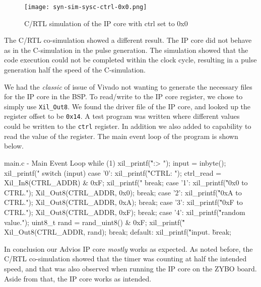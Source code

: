 \documentclass[../main.tex]{subfiles}
\begin{document}
\begin{figure}[h]
    \centering
    \texttt{[image: syn-sim-sysc-ctrl-0x0.png]}
    \caption{C/RTL simulation of the IP core with ctrl set to 0x0}
\end{figure}

The C/RTL co-simulation showed a different result. The IP core did not behave as in the C-simulation in the pulse generation. 
The simulation showed that the code execution could not be completed within the clock cycle, resulting in a pulse generation half the speed of the C-simulation.

\newpage

We had the \textit{classic} of issue of Vivado not wanting to generate the necessary files for the IP core in the BSP. To read/write to the IP core register, we chose to simply use \texttt{Xil\_Out8}. We found the driver file of the IP core, and looked up the register offset to be \texttt{0x14}. A test program was written where different values could be written to the \texttt{ctrl} register. In addition we also added to capability to read the value of the register. The main event loop of the program is shown below.

\begin{myminted}{main.c - Main Event Loop}
while (1)
{
    xil_printf("\r\n\nCMD:> ");
    input = inbyte();
    xil_printf("%
    switch (input)
    {
        case '0':
            xil_printf("\r\nReading CTRL: ");
            ctrl_read = Xil_In8(CTRL_ADDR) & 0xF;
            xil_printf("%
            break;
        case '1':
            xil_printf("\r\nWriting 0x0 to CTRL.");
            Xil_Out8(CTRL_ADDR, 0x0);
            break;
        case '2':
            xil_printf("\r\nWriting 0xA to CTRL.");
            Xil_Out8(CTRL_ADDR, 0xA);
            break;
        case '3':
            xil_printf("\r\nWriting 0xF to CTRL.");
            Xil_Out8(CTRL_ADDR, 0xF);
            break;
        case '4':
            xil_printf("\r\nGenerating random value.");
            uint8_t rand = rand_uint8() & 0xF;
            xil_printf("\r\nWriting %
            Xil_Out8(CTRL_ADDR, rand);
            break;
        default:
            xil_printf("\r\nUnrecognized input. \"%
            break;
    }
}
\end{myminted}

In conclusion our Advios IP core \textit{mostly} works as expected. As noted before, the C/RTL co-simulation showed that the timer was counting at half the intended speed, and that was also observed when running the IP core on the ZYBO board. Aside from that, the IP core works as intended.
\end{document}
